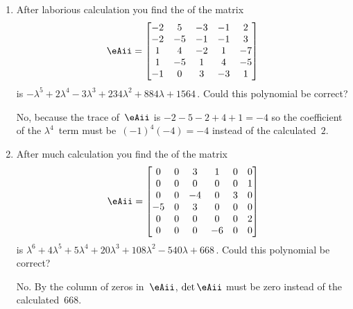 \begin{example}
\begin{enumerate}
\item After laborious calculation you find the  of the matrix
\begin{equation*}
\eAii=\begin{bmatrix}-2&5&-3&-1&2
\\-2&-5&-1&-1&3
\\1&4&-2&1&-7
\\1&-5&1&4&-5
\\-1&0&3&-3&1\end{bmatrix}
\end{equation*}
is \(-\lambda^5+2\lambda^4-3\lambda^3+234\lambda^2+884\lambda+1564\)\,.  
Could this polynomial be correct?
\begin{solution} 
No, because the trace of~\(\eAii\) is \(-2-5-2+4+1=-4\) so the coefficient of the \(\lambda^4\)~term must be~\((-1)^4(-4)=-4\) instead of the calculated~\(2\).
\end{solution}

\item After much calculation you find the  of the matrix
\begin{equation*}
\eAii=\begin{bmatrix}0&0&3&1&0&0
\\0&0&0&0&0&1
\\0&0&-4&0&3&0
\\-5&0&3&0&0&0
\\0&0&0&0&0&2
\\0&0&0&-6&0&0\end{bmatrix}
\end{equation*}
is \(\lambda^6 +4\lambda^5 +5\lambda^4 +20\lambda^3 +108\lambda^2 -540\lambda+668\)\,.  
Could this polynomial be correct?
\begin{solution} 
No. By the column of zeros in~\(\eAii\), \(\det \eAii\) must be zero instead of the calculated~\(668\).
\end{solution}


\end{enumerate}
\end{example}
